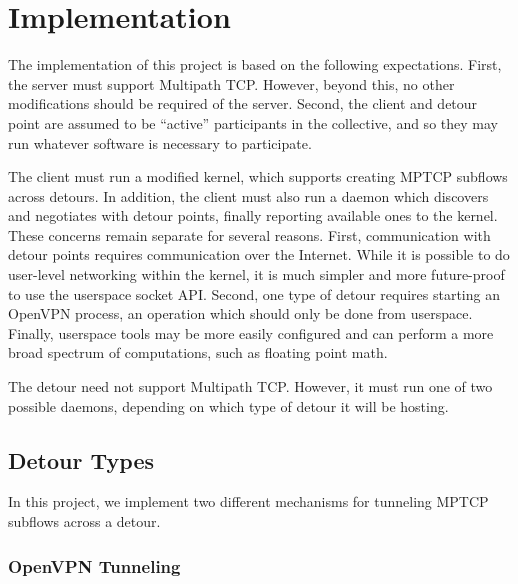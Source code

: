 \section{Implementation}



The implementation of this project is based on the following expectations.
First, the server must support Multipath TCP. However, beyond this, no other
modifications should be required of the server. Second, the client and detour
point are assumed to be ``active'' participants in the collective, and so they
may run whatever software is necessary to participate.

The client must run a modified kernel, which supports creating MPTCP subflows
across detours. In addition, the client must also run a daemon which discovers
and negotiates with detour points, finally reporting available ones to the
kernel. These concerns remain separate for several reasons. First, communication
with detour points requires communication over the Internet. While it is
possible to do user-level networking within the kernel, it is much simpler and
more future-proof to use the userspace socket API. Second, one type of detour
requires starting an OpenVPN process, an operation which should only be done
from userspace. Finally, userspace tools may be more easily configured and can
perform a more broad spectrum of computations, such as floating point math.

The detour need not support Multipath TCP. However, it must run one of two
possible daemons, depending on which type of detour it will be hosting.

\subsection{Detour Types}

In this project, we implement two different mechanisms for tunneling MPTCP
subflows across a detour.

\subsubsection{OpenVPN Tunneling}

